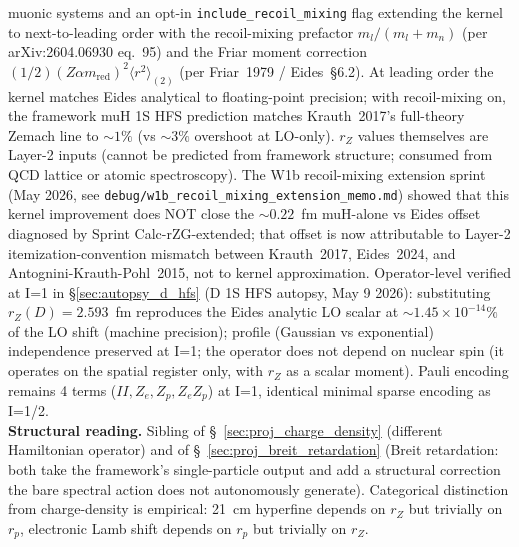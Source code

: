 \documentclass[11pt]{article}
\begin{document}
muonic systems and an opt-in \texttt{include\_recoil\_mixing} flag
extending the kernel to next-to-leading order with the recoil-mixing
prefactor $m_l/(m_l + m_n)$ (per arXiv:2604.06930 eq.~95) and the
Friar moment correction $(1/2)(Z\alpha m_\text{red})^2 \langle r^2
\rangle_{(2)}$ (per Friar~1979 / Eides~\S6.2).  At leading order the
kernel matches Eides analytical to floating-point precision; with
recoil-mixing on, the framework muH 1S HFS prediction matches
Krauth~2017's full-theory Zemach line to $\sim 1\%$ (vs $\sim 3\%$
overshoot at LO-only).  $r_Z$ values themselves are Layer-2 inputs
(cannot be predicted from framework structure; consumed from QCD
lattice or atomic spectroscopy).  The W1b recoil-mixing extension
sprint (May 2026, see \texttt{debug/w1b\_recoil\_mixing\_extension\_memo.md})
showed that this kernel improvement does NOT close the $\sim 0.22$~fm
muH-alone vs Eides offset diagnosed by Sprint Calc-rZG-extended;
that offset is now attributable to Layer-2 itemization-convention
mismatch between Krauth~2017, Eides~2024, and Antognini-Krauth-Pohl~2015,
not to kernel approximation.  Operator-level verified at I=1 in
\S\ref{sec:autopsy_d_hfs} (D 1S HFS autopsy, May 9 2026):
substituting $r_Z(D) = 2.593$~fm reproduces the Eides analytic LO
scalar at $\sim 1.45 \times 10^{-14}\%$ of the LO shift (machine
precision); profile (Gaussian vs exponential) independence preserved
at I=1; the operator does not depend on nuclear spin (it operates
on the spatial register only, with $r_Z$ as a scalar moment).  Pauli
encoding remains 4 terms ($II, Z_e, Z_p, Z_e Z_p$) at I=1, identical
minimal sparse encoding as I=1/2.\\
\textbf{Structural reading.}  Sibling of
\S~\ref{sec:proj_charge_density} (different Hamiltonian operator)
and of \S~\ref{sec:proj_breit_retardation} (Breit retardation:
both take the framework's single-particle output and add a
structural correction the bare spectral action does not
autonomously generate).  Categorical distinction from
charge-density is empirical: 21~cm hyperfine depends on $r_Z$ but
trivially on $r_p$, electronic Lamb shift depends on $r_p$ but
trivially on $r_Z$.
\end{document}
